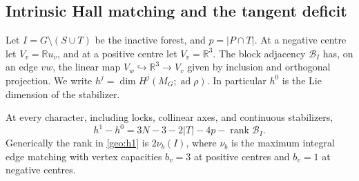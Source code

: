 \subsection{Intrinsic Hall matching and the tangent deficit}
Let \(I=G\setminus(S\cup T)\) be the inactive forest, and \(p=|P\cap T|\). At a negative centre let \(V_v=\mathbb R u_v\), and at a positive centre let \(V_v=\mathbb R^3\). The block adjacency \(\mathcal B_I\) has, on an edge \(vw\), the linear map \(V_w\hookrightarrow\mathbb R^3\to V_v\) given by inclusion and orthogonal projection. We write \(h^j=\dim H^j(M_G;\operatorname{ad}\rho)\). In particular \(h^0\) is the Lie dimension of the stabilizer.

\begin{theorem}\label{geo:tangent}
At every character, including locks, collinear axes, and continuous stabilizers,
\begin{equation}
            h^1-h^0=3N-3-2|T|-4p-\operatorname{rank}\mathcal B_I .
\label{geo:h1}
\end{equation}
Generically the rank in \eqref{geo:h1} is \(2\nu_b(I)\), where \(\nu_b\) is the maximum integral edge matching with vertex capacities \(b_v=3\) at positive centres and \(b_v=1\) at negative centres.
\end{theorem}

